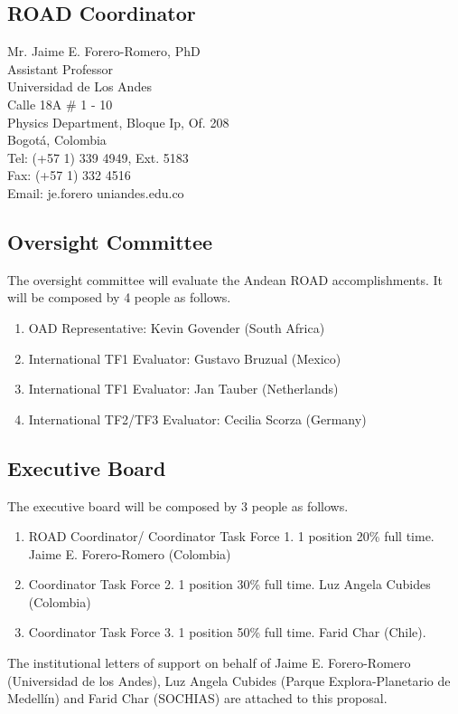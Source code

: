 \documentclass[12pt]{article}
\begin{document}
\subsection*{ROAD Coordinator}
\noindent
Mr. Jaime E. Forero-Romero, PhD\\
Assistant Professor\\
Universidad de Los Andes\\
Calle 18A \# 1 - 10\\
Physics Department, Bloque Ip, Of. 208\\
Bogot\'a, Colombia\\
Tel:  (+57 1) 339 4949, Ext. 5183\\
Fax: (+57 1) 332 4516 \\
Email: je.forero uniandes.edu.co\\

\subsection*{Oversight Committee}

The oversight committee will evaluate the Andean ROAD
accomplishments. It will be composed by 4 people as follows.
\begin{enumerate}
\item OAD Representative: Kevin Govender (South Africa)
\item International TF1 Evaluator: Gustavo Bruzual (Mexico)
\item International TF1 Evaluator: Jan Tauber (Netherlands)
\item International TF2/TF3 Evaluator: Cecilia Scorza (Germany)
\end{enumerate}
\subsection*{Executive Board}
\noindent
The executive board will be composed by 3 people as follows.
\begin{enumerate}
\item ROAD Coordinator/ Coordinator Task Force 1. 1 position 20\% full
  time. Jaime E. Forero-Romero (Colombia) 
\item Coordinator Task Force 2. 1 position 30\% full time. Luz Angela
  Cubides (Colombia) 
\item Coordinator Task Force 3. 1 position 50\% full time. Farid Char
  (Chile). 
\end{enumerate}

\noindent
The institutional letters of support on behalf of Jaime
E. Forero-Romero (Universidad de los Andes), Luz Angela Cubides
(Parque Explora-Planetario de Medell\'in) and Farid Char (SOCHIAS) are
attached to this proposal. 
\end{document}
